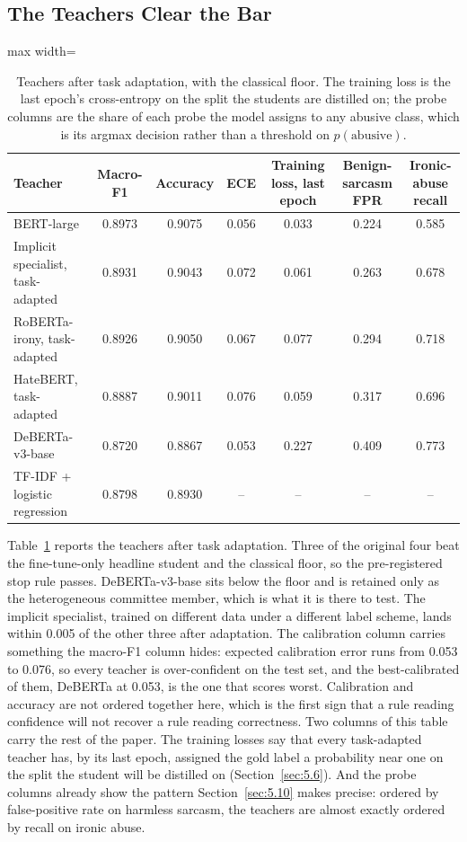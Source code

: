 \subsection{The Teachers Clear the Bar}
\label{sec:5.1}
\begin{table}[htbp]
\centering
\small
\caption[Teachers after task adaptation]{Teachers after task adaptation, with the classical floor. The training loss is the last epoch's cross-entropy on the split the students are distilled on; the probe columns are the share of each probe the model assigns to any abusive class, which is its argmax decision rather than a threshold on $p(\text{abusive})$.}
\label{tab:teachers}
\begin{adjustbox}{max width=\textwidth}
\begin{tabular}{lcccccc}
\toprule
Teacher & Macro-F1 & Accuracy & ECE & Training loss, last epoch & Benign-sarcasm FPR & Ironic-abuse recall \\
\midrule
BERT-large & 0.8973 & 0.9075 & 0.056 & 0.033 & 0.224 & 0.585 \\
Implicit specialist, task-adapted & 0.8931 & 0.9043 & 0.072 & 0.061 & 0.263 & 0.678 \\
RoBERTa-irony, task-adapted & 0.8926 & 0.9050 & 0.067 & 0.077 & 0.294 & 0.718 \\
HateBERT, task-adapted & 0.8887 & 0.9011 & 0.076 & 0.059 & 0.317 & 0.696 \\
DeBERTa-v3-base & 0.8720 & 0.8867 & 0.053 & 0.227 & 0.409 & 0.773 \\
TF-IDF + logistic regression & 0.8798 & 0.8930 & -- & -- & -- & -- \\
\bottomrule
\end{tabular}
\end{adjustbox}
\end{table}

Table~\ref{tab:teachers} reports the teachers after task adaptation. Three of the original four beat
the fine-tune-only headline student and the classical floor, so the pre-registered stop rule passes.
DeBERTa-v3-base sits below the floor and is retained only as the heterogeneous committee member,
which is what it is there to test. The implicit specialist, trained on different data under a
different label scheme, lands within 0.005 of the other three after adaptation. The calibration
column carries something the macro-F1 column hides: expected calibration error runs from 0.053 to
0.076, so every teacher is over-confident on the test set, and the best-calibrated of them, DeBERTa
at 0.053, is the one that scores worst. Calibration and accuracy are not ordered together here,
which is the first sign that a rule reading confidence will not recover a rule reading correctness.
Two columns of this table carry the rest of the paper. The training losses say that every
task-adapted teacher has, by its last epoch, assigned the gold label a probability near one on the
split the student will be distilled on (Section~\ref{sec:5.6}). And the probe columns already show
the pattern Section~\ref{sec:5.10} makes precise: ordered by false-positive rate on harmless
sarcasm, the teachers are almost exactly ordered by recall on ironic abuse.
